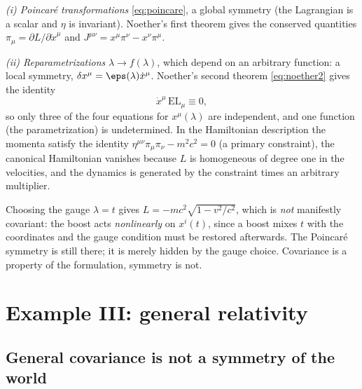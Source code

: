 \emph{(i) Poincar\'e transformations} \eqref{eq:poincare}, a global
symmetry (the Lagrangian is a scalar and $\eta$ is invariant). Noether's first
theorem gives the conserved quantities $\pi_\mu=\partial L/\partial\dot x^\mu$
and $J^{\mu\nu}=x^\mu\pi^\nu-x^\nu\pi^\mu$.

\emph{(ii) Reparametrizations} $\lambda\to f(\lambda)$, which depend on an
arbitrary function: a local symmetry, $\delta x^\mu=\eps(\lambda)\dot x^\mu$.
Noether's second theorem \eqref{eq:noether2} gives the identity
\begin{equation}\label{eq:param-identity}
  \dot x^\mu\,\mathrm{EL}_\mu\equiv0,
\end{equation}
so only three of the four equations for $x^\mu(\lambda)$ are independent, and
one function (the parametrization) is undetermined. In the Hamiltonian
description the momenta satisfy the identity
$\eta^{\mu\nu}\pi_\mu\pi_\nu-m^2c^2=0$ (a primary constraint), the canonical
Hamiltonian vanishes because $L$ is homogeneous of degree one in the
velocities, and the dynamics is generated by the constraint times an arbitrary
multiplier.

Choosing the gauge $\lambda=t$ gives
$L=-mc^2\sqrt{1-v^2/c^2}$, which is \emph{not} manifestly covariant: the
boost acts \emph{nonlinearly} on $x^i(t)$, since a boost mixes $t$ with the
coordinates and the gauge condition must be restored afterwards. The
Poincar\'e symmetry is still there; it is merely hidden by the gauge choice.
Covariance is a property of the formulation, symmetry is not.

\section{Example III: general relativity}
\label{sec:gr}

\subsection{General covariance is not a symmetry of the world}

